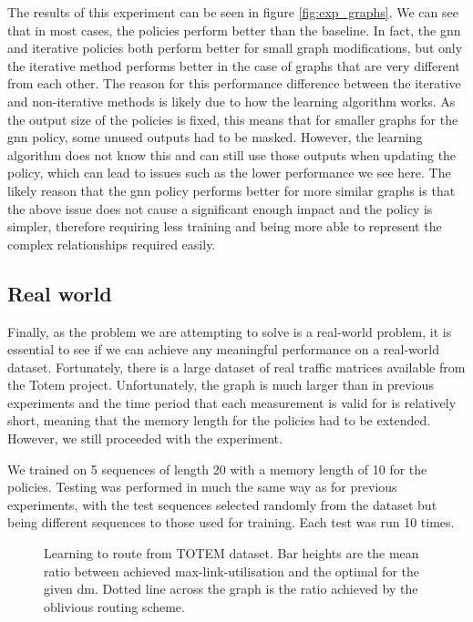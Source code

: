 The results of this experiment can be seen in figure \ref{fig:exp_graphs}. We can see that in most cases, the policies perform better than the baseline. In fact, the \ac{gnn} and iterative policies both perform better for small graph modifications, but only the iterative method performs better in the case of graphs that are very different from each other. The reason for this performance difference between the iterative and non-iterative methods is likely due to how the learning algorithm works. As the output size of the policies is fixed, this means that for smaller graphs for the \ac{gnn} policy, some unused outputs had to be masked. However, the learning algorithm does not know this and can still use those outputs when updating the policy, which can lead to issues such as the lower performance we see here. The likely reason that the \ac{gnn} policy performs better for more similar graphs is that the above issue does not cause a significant enough impact and the policy is simpler, therefore requiring less training and being more able to represent the complex relationships required easily.

\subsection{Real world}
Finally, as the problem we are attempting to solve is a real-world problem, it is essential to see if we can achieve any meaningful performance on a real-world dataset. Fortunately, there is a large dataset of real traffic matrices available from the Totem\cite{uhlig2006providing} project. Unfortunately, the graph is much larger than in previous experiments and the time period that each measurement is valid for is relatively short, meaning that the memory length for the policies had to be extended. However, we still proceeded with the experiment.

We trained on 5 sequences of length 20 with a memory length of 10 for the policies. Testing was performed in much the same way as for previous experiments, with the test sequences selected randomly from the dataset but being different sequences to those used for training. Each test was run 10 times.

\begin{figure}
    \centering
    
    \caption{Learning to route from TOTEM dataset. Bar heights are the mean ratio between achieved max-link-utilisation and the optimal for the given \ac{dm}. Dotted line across the graph is the ratio achieved by the oblivious routing scheme.}
    \label{fig:exp_real}
\end{figure}

